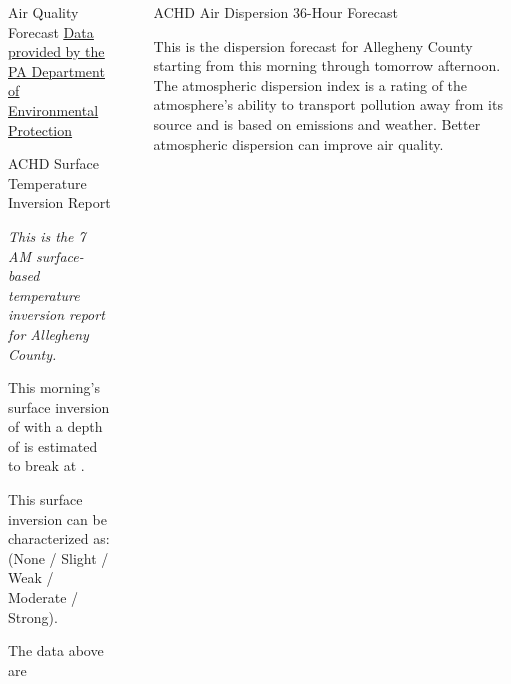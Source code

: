 \documentclass[final, xcolor=table]{beamer}
\newlength{\sepwidth}
\newlength{\colwidth}
\newcommand{\separatorcolumn}{\begin{column}{\sepwidth}\end{column}}
\begin{document}
\begin{frame}[t]
\begin{columns}[t]
\begin{column}{\colwidth}
\begin{block}{Air Quality Forecast}
    \href{https://www.ahs.dep.pa.gov/AQPartnersWeb/forecast_home.aspx}{\underline{Data provided by the PA Department of Environmental Protection}}

  \end{block} 
  

  \begin{block}{ACHD Surface Temperature Inversion Report}

    \textit{This is the 7 AM surface-based temperature inversion report for Allegheny County.}

    This morning’s surface inversion of \underline{\textbf{\Temp}} with a depth of \underline{\textbf{\Depth}} is estimated to break at \underline{\textbf{\Time}}. 
    
    This surface inversion can be characterized as: \underline{\textbf{\Scale}} (None / Slight / Weak / Moderate / Strong). 
    
    \Inversion

    The data above are \mode
    
  \end{block}

\end{column} 

\separatorcolumn



\begin{column}{\colwidth}


  \begin{block}{ACHD Air Dispersion 36-Hour Forecast}

    This is the dispersion forecast for Allegheny County starting from this morning through tomorrow afternoon. The atmospheric dispersion index is a rating of the atmosphere’s ability to transport pollution away from its source and is based on emissions and weather. Better atmospheric dispersion can improve air quality.


\end{block}
\end{column}
\end{columns}
\end{frame}
\end{document}
